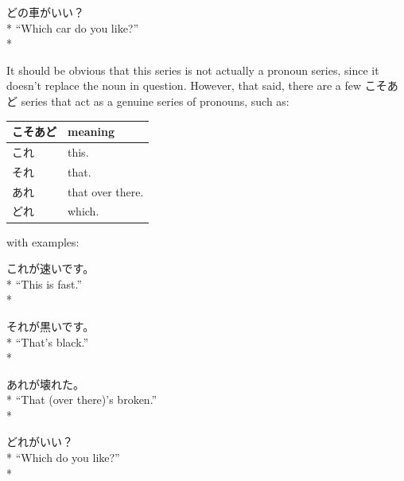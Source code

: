 \documentclass[11pt, b5paper, twoside, openright, onecolumn]{book}
\newenvironment{exampleblock}{
\setlength{\parindent}{0.6in}
\begin{minipage}[t]{\dimexpr\textwidth-\parindent}}
{\end{minipage}}
\newenvironment{mytabular}[1]{\noindent\hspace{0.4in}
\begin{tabular}[h]{#1}}{\end{tabular}}
\begin{document}
\begin{exampleblock}
どの車がいい？ \\* 
“Which car do you like?” \\* 
\end{exampleblock}
\vspace{0.2cm}

It should be obvious that this series is not actually a pronoun series‚ since it doesn’t replace the noun in question. However‚ that said‚ there are a few こそあど series that act as a genuine series of pronouns‚ such as:

\vspace{0.5cm}
\smaller
\begin{mytabular}{| l  l |}\hline 
\rule{0pt}{2.4ex}こそあど & meaning\\ 
\hline
\rule{0pt}{2.4ex}\index[japanese]{これ}これ & \index[english]{This}this.\\ 
\rule{0pt}{2.4ex}\index[japanese]{それ}それ & \index[english]{That}that.\\ 
\rule{0pt}{2.4ex}\index[japanese]{あれ}あれ & that over there.\\ 
\rule{0pt}{2.4ex}\index[japanese]{どれ}どれ & \index[english]{Which}which.\\ 
\hline 
\end{mytabular}
\larger
\vspace{0.5cm}


with examples:

\vspace{0.4cm}
\begin{exampleblock}
これが速いです。 \\* 
“This is fast.” \\* 
\end{exampleblock}
\vspace{0.2cm}

\begin{exampleblock}
それが黒いです。 \\* 
“That’s black.” \\* 
\end{exampleblock}
\vspace{0.2cm}

\begin{exampleblock}
あれが壊れた。 \\* 
“That (over there)’s broken.” \\* 
\end{exampleblock}
\vspace{0.2cm}

\begin{exampleblock}
どれがいい？ \\* 
“Which do you like?” \\* 
\end{exampleblock}
\vspace{0.2cm}
\end{document}

